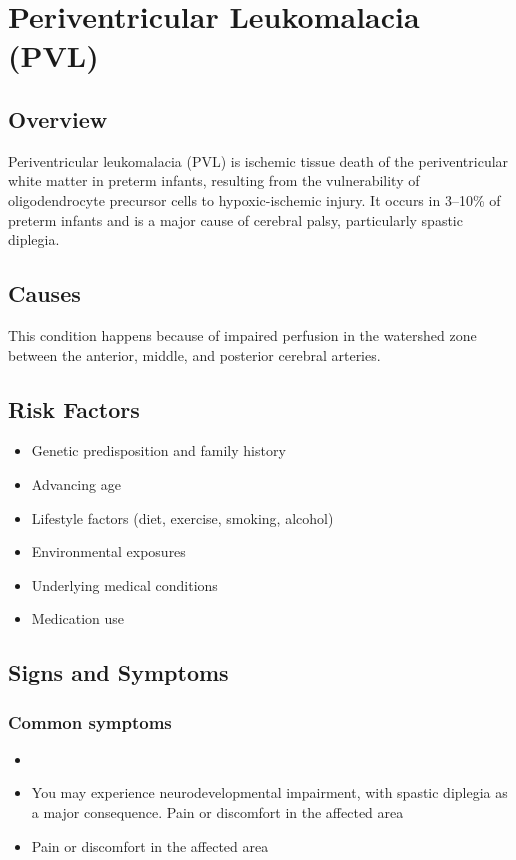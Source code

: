 \chapter{Periventricular Leukomalacia (PVL)}
\label{sec:Periventricular Leukomalacia}

\section{Overview}
Periventricular leukomalacia (PVL) is ischemic tissue death of the periventricular white matter in preterm infants, resulting from the vulnerability of oligodendrocyte precursor cells to hypoxic-ischemic injury. It occurs in 3--10\% of preterm infants and is a major cause of cerebral palsy, particularly spastic diplegia.
\section{Causes}
This condition happens because of impaired perfusion in the watershed zone between the anterior, middle, and posterior cerebral arteries.     
\section{Risk Factors}

\begin{itemize}[noitemsep]
  \item Genetic predisposition and family history
  \item Advancing age
  \item Lifestyle factors (diet, exercise, smoking, alcohol)
  \item Environmental exposures
  \item Underlying medical conditions
  \item Medication use
\end{itemize}
\section{Signs and Symptoms}

\subsection{Common symptoms}
\begin{itemize}[noitemsep]
  \item \item You may experience neurodevelopmental impairment, with spastic diplegia as a major consequence. Pain or discomfort in the affected area    \item Pain or discomfort in the affected area
  \end{itemize}

